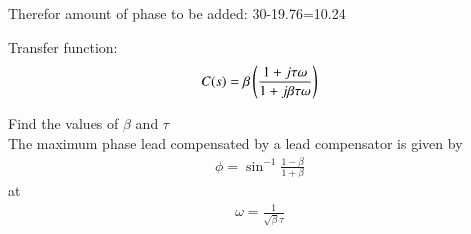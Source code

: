 Therefor amount of phase to be added: 30-19.76=10.24

Transfer function:
\begin{align}
C(s)=\beta\left(\frac{1+j\tau\omega}{1+j\beta\tau\omega}\right)
\label{eq:es17btech11019_lead_compensator}
\end{align}

Find the values of $\beta$ and $\tau$\\
\solution The maximum phase lead compensated by a lead compensator is given by\\
\begin{align}
\phi={\sin}^{-1}\frac{1-\beta}{1+\beta}
\label{eq:es17btech11019_beta}
\end{align}
at
\begin{align}
\omega =\frac{1}{\sqrt{\beta}\tau}
\label{eq:es17btech11019_omega}
\end{align}

